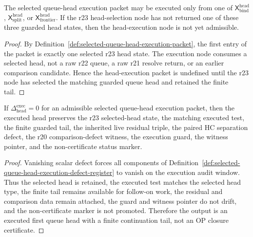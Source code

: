 \begin{lemma}
\label{lem:selected-head-is-head-execution-precondition}
The selected queue-head execution packet may be executed only from one of \(\mathsf X_{\mathrm{bind}}^{\mathrm{head}}\), \(\mathsf X_{\mathrm{split}}^{\mathrm{head}}\), or \(\mathsf X_{\mathrm{frontier}}^{\mathrm{head}}\).  If the r23 head-selection node has not returned one of these three guarded head states, then the head-execution node is not yet admissible.
\end{lemma}

\begin{proof}
By Definition~\ref{def:selected-queue-head-execution-packet}, the first entry of the packet is exactly one selected r23 head state.  The execution node consumes a selected head, not a raw r22 queue, a raw r21 resolve return, or an earlier comparison candidate.  Hence the head-execution packet is undefined until the r23 node has selected the matching guarded queue head and retained the finite tail.
\end{proof}

\begin{lemma}
\label{lem:zero-selected-head-execution-defect-preserves-head-execution-data}
If \(\Delta_{\mathrm{head}}^{\mathrm{exec}}=0\) for an admissible selected queue-head execution packet, then the executed head preserves the r23 selected-head state, the matching executed test, the finite guarded tail, the inherited live residual triple, the paired HC separation defect, the r20 comparison-defect witness, the execution guard, the witness pointer, and the non-certificate status marker.
\end{lemma}

\begin{proof}
Vanishing scalar defect forces all components of Definition~\ref{def:selected-queue-head-execution-defect-register} to vanish on the execution audit window.  Thus the selected head is retained, the executed test matches the selected head type, the finite tail remains available for follow-on work, the residual and comparison data remain attached, the guard and witness pointer do not drift, and the non-certificate marker is not promoted.  Therefore the output is an executed first queue head with a finite continuation tail, not an OP closure certificate.
\end{proof}

